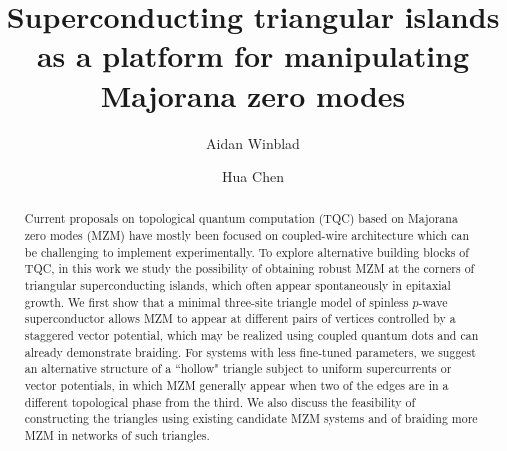 \documentclass[aps,prb,showpacs,amsmath,twocolumn,amssymb,superscriptaddress]{revtex4-2}
\begin{document}
\title{Superconducting triangular islands as a platform for manipulating Majorana zero modes}

\author{Aidan Winblad}

\author{Hua Chen}

\begin{abstract}
Current proposals on topological quantum computation (TQC) based on Majorana zero modes (MZM) have mostly been focused on coupled-wire architecture which can be challenging to implement experimentally. To explore alternative building blocks of TQC, in this work we study the possibility of obtaining robust MZM at the corners of triangular superconducting islands, which often appear spontaneously in epitaxial growth. We first show that a minimal three-site triangle model of spinless $p$-wave superconductor allows MZM to appear at different pairs of vertices controlled by a staggered vector potential, which may be realized using coupled quantum dots and can already demonstrate braiding. For systems with less fine-tuned parameters, we suggest an alternative structure of a ``hollow" triangle subject to uniform supercurrents or vector potentials, in which MZM generally appear when two of the edges are in a different topological phase from the third. We also discuss the feasibility of constructing the triangles using existing candidate MZM systems and of braiding more MZM in networks of such triangles.
\end{abstract}


\maketitle
\end{document}
